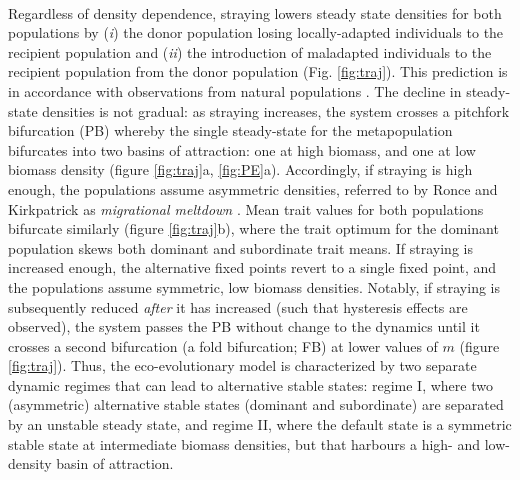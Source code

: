\documentclass{revtex4}
\begin{document}
 \\
\noindent Regardless of density dependence, straying lowers steady state densities for both populations by (\emph{i}) the donor population losing locally-adapted individuals to the recipient population and (\emph{ii}) the introduction of maladapted individuals to the recipient population from the donor population (Fig. \ref{fig:traj}).
This prediction is in accordance with observations from natural populations \citep{Bett:2017ha}. %
The decline in steady-state densities is not gradual: as straying increases, the system crosses a pitchfork bifurcation (PB) \citep{AleksandrovichKuznetsov:1995p2580} whereby the single steady-state for the metapopulation bifurcates into two basins of attraction: one at high biomass, and one at low biomass density (figure \ref{fig:traj}a, \ref{fig:PE}a).
Accordingly, if straying is high enough, the populations assume asymmetric densities, referred to by Ronce and Kirkpatrick as \emph{migrational meltdown} \citep{Ronce:2001dp}.
Mean trait values for both populations bifurcate similarly (figure \ref{fig:traj}b), where the trait optimum for the dominant population skews both dominant and subordinate trait means. 
If straying is increased enough, the alternative fixed points revert to a single fixed point, and the populations assume symmetric, low biomass densities.
Notably, if straying is subsequently reduced \emph{after} it has increased (such that hysteresis effects are observed), the system passes the PB without change to the dynamics until it crosses a second bifurcation (a fold bifurcation; FB) at lower values of $m$ (figure \ref{fig:traj}).
Thus, the eco-evolutionary model is characterized by two separate dynamic regimes that can lead to alternative stable states:
regime I, where two (asymmetric) alternative stable states (dominant and subordinate) are separated by an unstable steady state, and
regime II, where the default state is a symmetric stable state at intermediate biomass densities, but that harbours a high- and low-density basin of attraction.
% 
\end{document}
